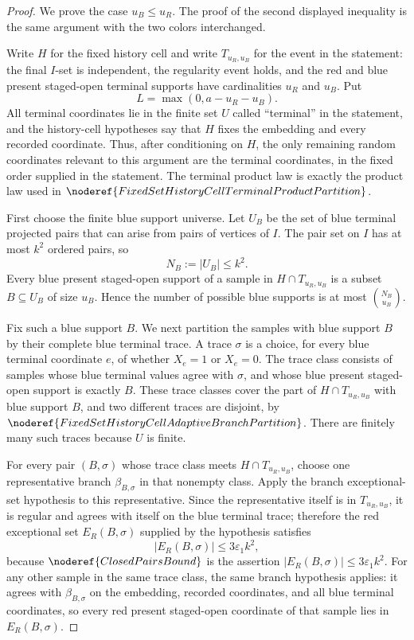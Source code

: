 \begin{proof}
We prove the case \(u_B\le u_R\).  The proof of the second displayed
inequality is the same argument with the two colors interchanged.

Write \(H\) for the fixed history cell and write \(T_{u_R,u_B}\) for the
event in the statement: the final \(I\)-set is independent, the regularity
event holds, and the red and blue present staged-open terminal supports have
cardinalities \(u_R\) and \(u_B\).  Put
\[
L=\max(0,a-u_R-u_B).
\]
All terminal coordinates lie in the finite set \(U\) called ``terminal'' in
the statement, and the history-cell hypotheses say that \(H\) fixes the
embedding and every recorded coordinate.  Thus, after conditioning on \(H\),
the only remaining random coordinates relevant to this argument are the
terminal coordinates, in the fixed order supplied in the statement.  The
terminal product law is exactly the product law used in
\(\noderef{FixedSetHistoryCellTerminalProductPartition}\).

First choose the finite blue support universe.  Let \(U_B\) be the set of
blue terminal projected pairs that can arise from pairs of vertices of
\(I\).  The pair set on \(I\) has at most \(k^2\) ordered pairs, so
\[
N_B:=|U_B|\le k^2.
\]
Every blue present staged-open support of a sample in \(H\cap T_{u_R,u_B}\)
is a subset \(B\subseteq U_B\) of size \(u_B\).  Hence the number of possible
blue supports is at most \(\binom{N_B}{u_B}\).

Fix such a blue support \(B\).  We next partition the samples with blue
support \(B\) by their complete blue terminal trace.  A trace \(\sigma\) is a
choice, for every blue terminal coordinate \(e\), of whether
\(X_e=1\) or \(X_e=0\).  The trace class consists of samples whose blue
terminal values agree with \(\sigma\), and whose blue present staged-open
support is exactly \(B\).  These trace classes cover the part of
\(H\cap T_{u_R,u_B}\) with blue support \(B\), and two different traces are
disjoint, by \(\noderef{FixedSetHistoryCellAdaptiveBranchPartition}\).
There are finitely many such traces because \(U\) is finite.

For every pair \((B,\sigma)\) whose trace class meets
\(H\cap T_{u_R,u_B}\), choose one representative branch
\(\beta_{B,\sigma}\) in that nonempty class.  Apply the branch exceptional-set
hypothesis to this representative.  Since the representative itself is in
\(T_{u_R,u_B}\), it is regular and agrees with itself on the blue terminal
trace; therefore the red exceptional set \(E_R(B,\sigma)\) supplied by the
hypothesis satisfies
\[
|E_R(B,\sigma)|\le 3\varepsilon_1 k^2,
\]
because \(\noderef{ClosedPairsBound}\) is the assertion
\(|E_R(B,\sigma)|\le 3\varepsilon_1 k^2\).  For any other sample in the same
trace class, the same branch hypothesis applies: it agrees with
\(\beta_{B,\sigma}\) on the embedding, recorded coordinates, and all blue
terminal coordinates, so every red present staged-open coordinate of that
sample lies in \(E_R(B,\sigma)\).


\end{proof}
